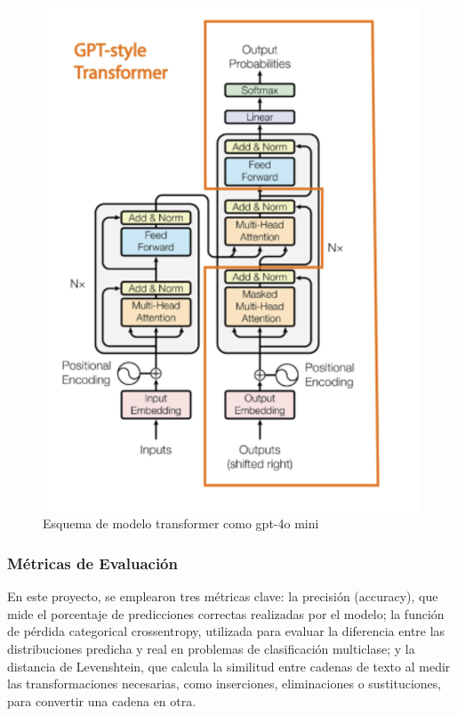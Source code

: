 \documentclass{article}
\begin{document}
\begin{figure}[!hbtp]
    \centering
    \includegraphics[width=5in]{figuras/Gpt_style_Transformer.png}
		\caption{Esquema de modelo transformer como gpt-4o mini}
		\label{fig4}
\end{figure}

\subsubsection{Métricas de Evaluación}

En este proyecto, se emplearon tres métricas clave: la precisión (accuracy), que mide el porcentaje de predicciones correctas realizadas por el modelo; la función de pérdida categorical crossentropy, utilizada para evaluar la diferencia entre las distribuciones predicha y real en problemas de clasificación multiclase; y la distancia de Levenshtein, que calcula la similitud entre cadenas de texto al medir las transformaciones necesarias, como inserciones, eliminaciones o sustituciones, para convertir una cadena en otra. 
\end{document}
